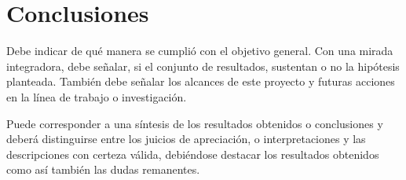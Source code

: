 \setcounter{figure}{0} %
\renewcommand{\thefigure}{\thesection.\arabic{figure}}
\section{\Large Conclusiones}

Debe indicar de qué manera se cumplió con el objetivo general. Con una mirada integradora, debe señalar, si el conjunto de resultados, sustentan o no la hipótesis planteada. También debe señalar los alcances de este proyecto y futuras acciones en la línea de trabajo o investigación.\par
Puede corresponder a una síntesis de los resultados obtenidos o conclusiones y deberá distinguirse entre los juicios de apreciación, o interpretaciones y las descripciones con certeza válida, debiéndose destacar los resultados obtenidos como así también las dudas remanentes. 